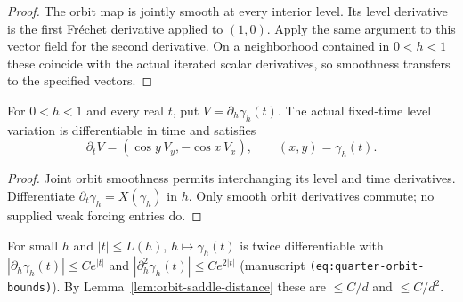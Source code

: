 \begin{proof}
\leanok
The orbit map is jointly smooth at every interior level.
Its level derivative is the first Fréchet derivative applied to $(1,0)$.
Apply the same argument to this vector field for the second derivative.
On a neighborhood contained in $0<h<1$ these coincide with the actual
iterated scalar derivatives, so smoothness transfers to the specified vectors.
\end{proof}

\begin{lemma}
\label{lem:orbit-level-time-equation}
\leanok
For $0<h<1$ and every real $t$, put $V=\partial_h\gamma_h(t)$.
The actual fixed-time level variation is differentiable in time and satisfies
\[
 \partial_t V=(\cos y\,V_y,-\cos x\,V_x),
 \qquad (x,y)=\gamma_h(t).
\]
\end{lemma}

\begin{proof}
\leanok
Joint orbit smoothness permits interchanging its level and time derivatives.
Differentiate $\partial_t\gamma_h=X(\gamma_h)$ in $h$.
Only smooth orbit derivatives commute; no supplied weak forcing entries do.
\end{proof}

\begin{lemma}
\label{lem:orbit-level-derivatives}
\leanok
For small $h$ and $|t|\le L(h)$, $h\mapsto\gamma_h(t)$ is twice differentiable with
$|\partial_h\gamma_h(t)|\le Ce^{|t|}$ and $|\partial_h^2\gamma_h(t)|\le Ce^{2|t|}$
(manuscript \texttt{(eq:quarter-orbit-bounds)}). By
Lemma~\ref{lem:orbit-saddle-distance} these are $\le C/d$ and $\le C/d^2$.
\end{lemma}

